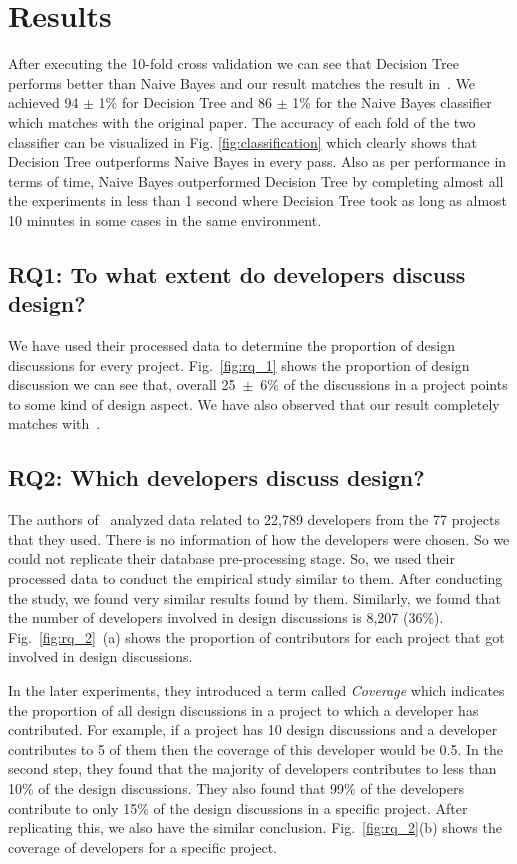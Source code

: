 \section{Results}
\label{sect:results}
After executing the 10-fold cross validation we can see that Decision Tree performs better than Naive Bayes and our result matches the result in~\cite{Brunet2014a}. We achieved 94 {$\pm$} 1\% for Decision Tree and 86 {$\pm$} 1\% for the Naive Bayes classifier which matches with the original paper. The accuracy of each fold of the two classifier can be visualized in Fig. \ref{fig:classification} which clearly shows that Decision Tree outperforms Naive Bayes in every pass. Also as per performance in terms of time, Naive Bayes outperformed Decision Tree by completing almost all the experiments in less than 1 second where Decision Tree took as long as almost 10 minutes in some cases in the same environment.

\subsection{RQ1: To what extent do developers discuss design?}
We have used their processed data to determine the proportion of design discussions for every project. Fig.~\ref{fig:rq_1} shows the proportion of design discussion we can see that, overall 25~{$\pm$}~6\% of the discussions in a project points to some kind of design aspect. We have also observed that our result completely matches with~\cite{Brunet2014a}.

\subsection{RQ2: Which developers discuss design?}
The authors of~\cite{Brunet2014a} analyzed data related to 22,789 developers from the 77 projects that they used. There is no information of how the developers were chosen. So we could not replicate their database pre-processing stage. So, we used their processed data to conduct the empirical study similar to them. After conducting the study, we found very similar results found by them. Similarly, we found that the number of developers involved in design discussions is 8,207 (36\%). Fig.~\ref{fig:rq_2}~(a) shows the proportion of contributors for each project that got involved in design discussions.

In the later experiments, they introduced a term called \emph{Coverage} which indicates the proportion of all design discussions in a project to which a developer has contributed. For example, if a project has 10 design discussions and a developer contributes to 5 of them then the coverage of this developer would be 0.5. In the second step, they found that the majority of developers contributes to less than 10\% of the design discussions. They also found that 99\% of the developers contribute to only 15\% of the design discussions in a specific project. After replicating this, we also have the similar conclusion. Fig.~\ref{fig:rq_2}(b) shows the coverage of developers for a specific project.

